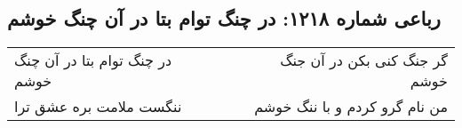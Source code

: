 \begin{center}
\section*{رباعی شماره ۱۲۱۸: در چنگ توام بتا در آن چنگ خوشم}
\label{sec:1218}
\begin{longtable}{l p{0.5cm} r}
در چنگ توام بتا در آن چنگ خوشم
&&
گر جنگ کنی بکن در آن جنگ خوشم
\\
ننگست ملامت بره عشق ترا
&&
من نام گرو کردم و با ننگ خوشم
\\
\end{longtable}
\end{center}
